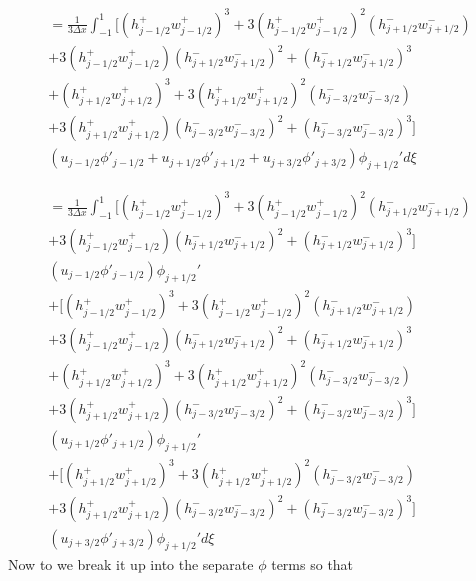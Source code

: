 \documentclass[12pt]{article}
\begin{document}
\begin{multline}
= \frac{1}{3\Delta x} \int_{-1}^{1} \bigg[ \left(h^+_{j- 1/2}w^+_{j - 1/2}\right)^3 + 3 \left(h^+_{j- 1/2}w^+_{j - 1/2}\right)^2\left(h^-_{j+ 1/2}w^-_{j + 1/2}\right) \\ + 3\left(h^+_{j- 1/2}w^+_{j - 1/2}\right)\left(h^-_{j+ 1/2}w^-_{j + 1/2}\right)^2 +\left(h^-_{j+ 1/2}w^-_{j + 1/2}\right)^3  \\ + \left(h^+_{j+ 1/2}w^+_{j + 1/2}\right)^3 + 3\left(h^+_{j+ 1/2}w^+_{j + 1/2}\right)^2\left(h^-_{j- 3/2}w^-_{j - 3/2}\right) \\ + 3\left(h^+_{j+ 1/2}w^+_{j + 1/2}\right) \left(h^-_{j- 3/2}w^-_{j - 3/2}\right)^2 + \left(h^-_{j- 3/2}w^-_{j - 3/2}\right)^3  \bigg] \\ \left(u_{j- 1/2}\phi'_{j - 1/2} + u_{j+1/2}\phi'_{j+1/2} +u_{j+ 3/2}\phi'_{j+ 3/2} \right)\phi_{j+1/2}'d\xi
\end{multline}

\begin{multline}
= \frac{1}{3\Delta x} \int_{-1}^{1} \bigg[ \left(h^+_{j- 1/2}w^+_{j - 1/2}\right)^3 + 3 \left(h^+_{j- 1/2}w^+_{j - 1/2}\right)^2\left(h^-_{j+ 1/2}w^-_{j + 1/2}\right) \\ + 3\left(h^+_{j- 1/2}w^+_{j - 1/2}\right)\left(h^-_{j+ 1/2}w^-_{j + 1/2}\right)^2 +\left(h^-_{j+ 1/2}w^-_{j + 1/2}\right)^3 \bigg] \\ \left(u_{j- 1/2}\phi'_{j - 1/2} \right)\phi_{j+1/2}' \\ + 
\bigg[ \left(h^+_{j- 1/2}w^+_{j - 1/2}\right)^3 + 3 \left(h^+_{j- 1/2}w^+_{j - 1/2}\right)^2\left(h^-_{j+ 1/2}w^-_{j + 1/2}\right) \\ + 3\left(h^+_{j- 1/2}w^+_{j - 1/2}\right)\left(h^-_{j+ 1/2}w^-_{j + 1/2}\right)^2 +\left(h^-_{j+ 1/2}w^-_{j + 1/2}\right)^3  \\ + \left(h^+_{j+ 1/2}w^+_{j + 1/2}\right)^3 + 3\left(h^+_{j+ 1/2}w^+_{j + 1/2}\right)^2\left(h^-_{j- 3/2}w^-_{j - 3/2}\right) \\ + 3\left(h^+_{j+ 1/2}w^+_{j + 1/2}\right) \left(h^-_{j- 3/2}w^-_{j - 3/2}\right)^2 + \left(h^-_{j- 3/2}w^-_{j - 3/2}\right)^3  \bigg] \\ \left(u_{j+1/2}\phi'_{j+1/2}\right)\phi_{j+1/2}' \\+ 
\bigg[ \left(h^+_{j+ 1/2}w^+_{j + 1/2}\right)^3 + 3\left(h^+_{j+ 1/2}w^+_{j + 1/2}\right)^2\left(h^-_{j- 3/2}w^-_{j - 3/2}\right) \\ + 3\left(h^+_{j+ 1/2}w^+_{j + 1/2}\right) \left(h^-_{j- 3/2}w^-_{j - 3/2}\right)^2 + \left(h^-_{j- 3/2}w^-_{j - 3/2}\right)^3  \bigg] \\ \left(u_{j+ 3/2}\phi'_{j+ 3/2} \right)\phi_{j+1/2}'d\xi
\end{multline}
Now to we break it up into the separate $\phi$ terms so that
\end{document}
